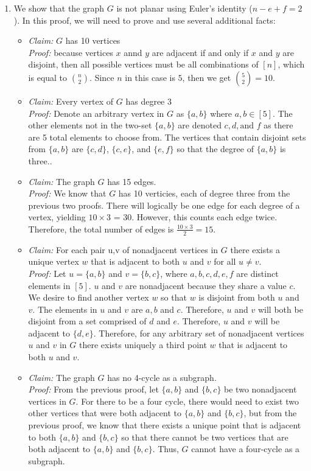 \documentclass{article}
\begin{document}
\begin{enumerate}
	\item We show that the graph $G$ is not planar using Euler's identity ($n - e + f = 2$). In this proof, we will need to prove and use several additional facts:
		\begin{itemize}
			\item {\it Claim:} $G$ has 10 vertices \\
				{\it Proof:} because vertices $x$ annd $y$ are adjacent if and only if $x$ and $y$ are disjoint, then all possible vertices must be all combinations of $[n]$, which is equal to ${n \choose 2}$. Since $n$ in this case is $5$, then we get ${5 \choose 2} = 10$.
			\item {\it Claim: } Every vertex of $G$ has degree 3 \\
				{\it Proof: } Denote an arbitrary vertex in $G$ as $\{a,b\}$ where $a,b \in [5]$. The other elements not in the two-set $\{a,b\}$ are denoted $c,d, \text{and }f$ as there are 5 total elements to choose from. The vertices that contain disjoint sets from $\{a,b\}$ are $\{c,d\}$, $\{c,e\}$, and $\{e,f\}$ so that the degree of $\{a,b\}$ is three..
			\item {\it Claim: } The graph $G$ has 15 edges. \\
				{\it Proof: } We know that $G$ has 10 verticies, each of degree three from the previous two proofs. There will logically be one edge for each degree of a vertex, yielding $10 \times 3$ = 30. However, this counts each edge twice.  Therefore, the total number of edges is $\frac{10\times 3}{2} = 15$.
			\item {\it Claim: } For each pair u,v of nonadjacent vertices in $G$ there exists a unique vertex $w$ that is adjacent to both $u$ and $v$ for all $u\ne v$. \\
				{\it Proof: } Let $u = \{a,b\}$ and $v = \{b,c\}$, where $a,b,c,d,e,f$ are distinct elements in $[5]$. $u$ and $v$ are nonadjacent because they share a value $c$.  We desire to find another vertex $w$ so that $w$ is disjoint from both $u$ and $v$. The elements in $u$ and $v$ are $a,b$ and $c$. Therefore, $u$ and $v$ will both be disjoint from a set comprised of $d$ and $e$. Therefore, $u$ and $v$ will be adjacent to $\{d,e\}$. Therefore, for any arbitrary set of nonadjacent vertices $u$ and $v$ in $G$ there exists uniquely a third point $w$ that is adjacent to both $u$ and $v$.
			\item {\it Claim: } The graph $G$ has no 4-cycle as a subgraph. \\
				{\it Proof: } From the previous proof, let $\{a,b\}$ and $\{b, c\}$ be two nonadjacent vertices in $G$. For there to be a four cycle, there would need to exist two other vertices that were both adjacent to $\{a,b\}$ and $\{b,c\}$, but from the previous proof, we know that there exists a unique point that is adjacent to both $\{a,b\}$ and $\{b,c\}$ so that there cannot be two vertices that are both adjacent to $\{a,b\}$ and $\{b,c\}$. Thus, $G$ cannot have a four-cycle as a subgraph.

\end{itemize}
\end{enumerate}
\end{document}
